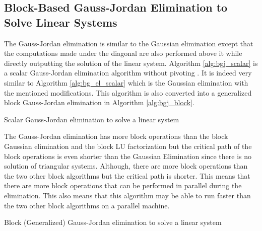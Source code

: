 \subsection{Block-Based Gauss-Jordan Elimination to Solve Linear Systems}

The Gauss-Jordan elimination \cite{Petit1989} \cite{Attaw2012} is similar to the Gaussian elimination except that the computations made under the diagonal are also performed above it while directly outputting the solution of the linear system.
Algorithm \ref{alg:bgj_scalar} is a scalar Gauss-Jordan elimination algorithm without pivoting \cite{Attaw2012}.
It is indeed very similar to Algorithm \ref{alg:bg_el_scalar} which is the Gaussian elimination with the mentioned modifications.
This algorithm is also converted into a generalized block Gauss-Jordan elimination \cite{MelTP1999} in Algorithm \ref{alg:bgj_block}.

\begin{algorithm}[h]
	\DontPrintSemicolon
	\caption{Scalar Gauss-Jordan elimination to solve a linear system \label{alg:bgj_scalar} }
\end{algorithm}

The Gauss-Jordan elimination has more block operations than the block Gaussian elimination and the block LU factorization but the critical path of the block operations is even shorter than the Gaussian Elimination since there is no solution of triangular systems.
Although, there are more block operations than the two other block algorithms but the critical path is shorter.
This means that there are more block operations that can be performed in parallel during the elimination.
This also means that this algorithm may be able to run faster than the two other block algorithms on a parallel machine.

\begin{algorithm}[h]
	\DontPrintSemicolon
	\caption{Block (Generalized) Gauss-Jordan elimination to solve a linear system \label{alg:bgj_block} }
\end{algorithm}


